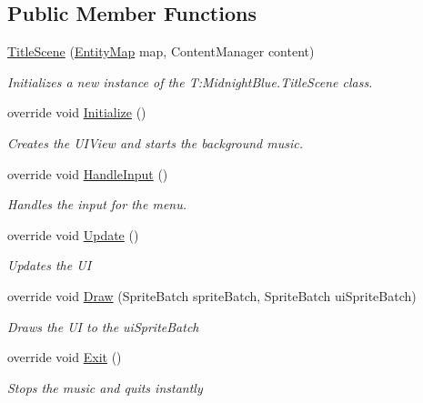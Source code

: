 \subsection*{Public Member Functions}
\begin{DoxyCompactItemize}
\item 
\hyperlink{class_midnight_blue_1_1_title_scene_a409eb89a58dbec10d5a0002ce78bc9a3}{Title\+Scene} (\hyperlink{class_m_b2_d_1_1_entity_component_1_1_entity_map}{Entity\+Map} map, Content\+Manager content)
\begin{DoxyCompactList}\small\item\em Initializes a new instance of the T\+:\+Midnight\+Blue.\+Title\+Scene class. \end{DoxyCompactList}\item 
override void \hyperlink{class_midnight_blue_1_1_title_scene_a793aa8253fba8d62a4ee19f042b22891}{Initialize} ()
\begin{DoxyCompactList}\small\item\em Creates the U\+I\+View and starts the background music. \end{DoxyCompactList}\item 
override void \hyperlink{class_midnight_blue_1_1_title_scene_a54dc02f150eb90dac2fcc6e37a077723}{Handle\+Input} ()
\begin{DoxyCompactList}\small\item\em Handles the input for the menu. \end{DoxyCompactList}\item 
override void \hyperlink{class_midnight_blue_1_1_title_scene_a4052b2a261434462cd0150e2f4da3c5b}{Update} ()
\begin{DoxyCompactList}\small\item\em Updates the UI \end{DoxyCompactList}\item 
override void \hyperlink{class_midnight_blue_1_1_title_scene_a03fa806a36226ec5fd0ce09870109c18}{Draw} (Sprite\+Batch sprite\+Batch, Sprite\+Batch ui\+Sprite\+Batch)
\begin{DoxyCompactList}\small\item\em Draws the UI to the ui\+Sprite\+Batch \end{DoxyCompactList}\item 
override void \hyperlink{class_midnight_blue_1_1_title_scene_aed29e37e9f849cc8f8443bae057a8eb8}{Exit} ()
\begin{DoxyCompactList}\small\item\em Stops the music and quits instantly \end{DoxyCompactList}\item 

\end{DoxyCompactItemize}
